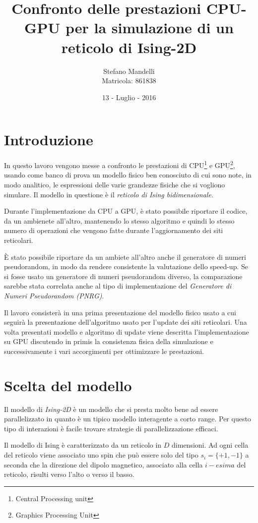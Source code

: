 \documentclass[a4paper,12pt]{article}
\begin{document}
\author{Stefano Mandelli\\
Matricola: 861838}
\title{\bf \Huge Confronto delle prestazioni CPU-GPU per la simulazione di un reticolo di Ising-2D}
\date{13 - Luglio - 2016}
\maketitle
\section*{Introduzione}
In questo lavoro vengono messe a confronto le prestazioni di CPU\footnote{Central Processing unit} e GPU\footnote{Graphics Processing Unit}, usando come banco di prova un modello fisico ben conosciuto di cui sono note, in modo analitico, le espressioni delle varie grandezze fisiche che si vogliono simulare. Il modello in questione \`e il \emph{reticolo di Ising bidimensionale}. 

Durante l'implementazione da CPU a GPU, \`e stato possibile riportare il codice, da un ambienete all'altro, mantenendo lo stesso algoritmo e quindi lo stesso numero di operazioni che vengono fatte durante l'aggiornamento dei siti reticolari.

\`E stato possibile riportare da un ambiete all'altro anche il generatore di numeri pseudorandom, in modo da rendere consistente la valutazione dello speed-up. Se si fosse usato un generatore di numeri pseudorandom diverso, la comparazione sarebbe stata correlata anche al tipo di implementazione del \emph{Generatore di Numeri Pseudorandom (PNRG)}. 

Il lavoro consister\`a in una prima presentazione del modello fisico usato a cui seguir\`a la presentazione dell'algoritmo usato per l'update dei siti reticolari. Una volta presentati modello e algoritmo di update viene descritta l'implementazione su GPU discutendo in primis la consistenza fisica della simulazione e successivamente i vari accorgimenti per ottimizzare le prestazioni.


\section{Scelta del modello}
Il modello di \emph{Ising-2D} è un modello che si presta molto bene ad essere parallelizzato in quanto è un tipico modello interagente a corto range. Per questo tipo di interazioni \`e facile trovare strategie di parallelizzazione efficaci.

Il modello di Ising è caratterizzato da un reticolo in $D$ dimensioni. Ad ogni cella del reticolo viene associato uno spin che può essere solo del tipo $s_i=\lbrace +1, -1 \rbrace$ a seconda che la direzione del dipolo magnetico, associato alla cella $i-esima$ del reticolo, risulti verso l'alto o verso il basso. 
\end{document}
